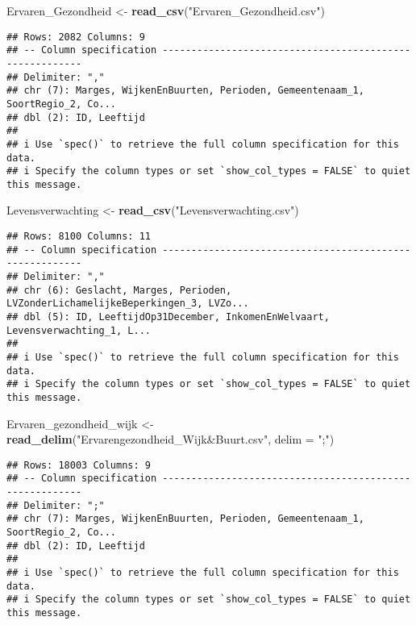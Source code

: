 \documentclass[
]{article}
\newenvironment{Shaded}{\begin{snugshade}}{\end{snugshade}}
\newcommand{\AttributeTok}[1]{\textcolor[rgb]{0.13,0.29,0.53}{#1}}
\newcommand{\FunctionTok}[1]{\textcolor[rgb]{0.13,0.29,0.53}{\textbf{#1}}}
\newcommand{\NormalTok}[1]{#1}
\newcommand{\OtherTok}[1]{\textcolor[rgb]{0.56,0.35,0.01}{#1}}
\newcommand{\StringTok}[1]{\textcolor[rgb]{0.31,0.60,0.02}{#1}}
\begin{document}
\begin{Shaded}
\begin{Highlighting}[]
\NormalTok{Ervaren\_Gezondheid }\OtherTok{\textless{}{-}} \FunctionTok{read\_csv}\NormalTok{(}\StringTok{"Ervaren\_Gezondheid.csv"}\NormalTok{)}
\end{Highlighting}
\end{Shaded}

\begin{verbatim}
## Rows: 2082 Columns: 9
## -- Column specification --------------------------------------------------------
## Delimiter: ","
## chr (7): Marges, WijkenEnBuurten, Perioden, Gemeentenaam_1, SoortRegio_2, Co...
## dbl (2): ID, Leeftijd
## 
## i Use `spec()` to retrieve the full column specification for this data.
## i Specify the column types or set `show_col_types = FALSE` to quiet this message.
\end{verbatim}

\begin{Shaded}
\begin{Highlighting}[]
\NormalTok{Levensverwachting }\OtherTok{\textless{}{-}} \FunctionTok{read\_csv}\NormalTok{(}\StringTok{"Levensverwachting.csv"}\NormalTok{)}
\end{Highlighting}
\end{Shaded}

\begin{verbatim}
## Rows: 8100 Columns: 11
## -- Column specification --------------------------------------------------------
## Delimiter: ","
## chr (6): Geslacht, Marges, Perioden, LVZonderLichamelijkeBeperkingen_3, LVZo...
## dbl (5): ID, LeeftijdOp31December, InkomenEnWelvaart, Levensverwachting_1, L...
## 
## i Use `spec()` to retrieve the full column specification for this data.
## i Specify the column types or set `show_col_types = FALSE` to quiet this message.
\end{verbatim}

\begin{Shaded}
\begin{Highlighting}[]
\NormalTok{Ervaren\_gezondheid\_wijk }\OtherTok{\textless{}{-}} \FunctionTok{read\_delim}\NormalTok{(}\StringTok{"Ervarengezondheid\_Wijk\&Buurt.csv"}\NormalTok{, }\AttributeTok{delim =} \StringTok{";"}\NormalTok{)}
\end{Highlighting}
\end{Shaded}

\begin{verbatim}
## Rows: 18003 Columns: 9
## -- Column specification --------------------------------------------------------
## Delimiter: ";"
## chr (7): Marges, WijkenEnBuurten, Perioden, Gemeentenaam_1, SoortRegio_2, Co...
## dbl (2): ID, Leeftijd
## 
## i Use `spec()` to retrieve the full column specification for this data.
## i Specify the column types or set `show_col_types = FALSE` to quiet this message.
\end{verbatim}
\end{document}
